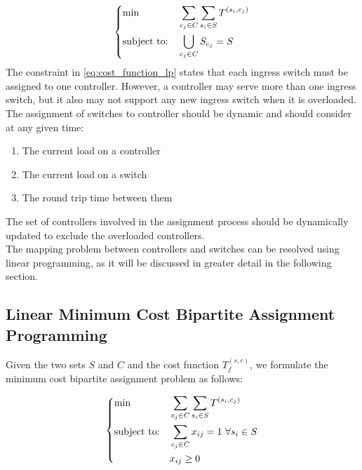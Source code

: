 \documentclass{article}
\begin{document}
\begin{equation}\label{eq:cost_function_lp}
	\begin{dcases}
		\begin{aligned}
			& {\text{min}}
			& & \sum_{c_j \in C} \sum_{s_i \in S} T^{(s_i,c_j)} \\
			& \text{subject to:}
			& & \bigcup_{c_j \in C} S_{c_j} = S
		\end{aligned}
	\end{dcases}
\end{equation}
The constraint in \eqref{eq:cost_function_lp} states that each ingress switch must be assigned to one controller.
However, a controller may serve more than one ingress switch, but it also may not support any new ingress switch when it is overloaded. \\
The assignment of switches to controller should be dynamic and should consider at any given time:
\begin{enumerate}
	\item The current load on a controller
	\item The current load on a switch
	\item The round trip time between them
\end{enumerate}

The set of controllers involved in the assignment process should be dynamically updated to exclude the overloaded controllers. \\
The mapping problem between controllers and switches can be resolved using linear programming, as it will be discussed in greater detail in the following section.

\pagebreak

\subsection{Linear Minimum Cost Bipartite Assignment Programming}

Given the two sets $S$ and $C$ and the cost function $T^{(s,c)}_f$, we formulate the minimum cost bipartite assignment problem as follows:

\begin{equation}\label{eq:bipartite_formulation}
	\begin{dcases}
		\begin{aligned}
			& {\text{min}}
			& & \sum_{c_j \in C} \sum_{s_i \in S} T^{(s_i,c_j)} \\
			& \text{subject to:}
			& & \sum_{c_j \in C} x_{ij} = 1 \ \forall s_i \in S \\
			& & & x_{ij} \ge 0
		\end{aligned}
	\end{dcases}
\end{equation}
\end{document}
